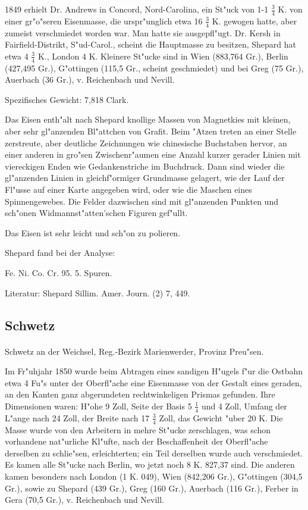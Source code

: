 \documentclass[a4paper, 11pt, oneside]{article}
\begin{document}
1849 erhielt Dr. Andrews in Concord, Nord-Carolina, ein St"uck von 1-1 $\frac{3}{4}$ K. von einer gr"o"seren Eisenmasse, die urspr"unglich etwa 16 $\frac{3}{4}$ K. gewogen hatte, aber zumeist verschmiedet worden war. Man hatte sie ausgepfl"ugt. Dr. Kersh in Fairfield-Distrikt, S"ud-Carol., scheint die Hauptmasse zu besitzen, Shepard hat etwa 4 $\frac{3}{4}$ K., London 4 K. Kleinere St"ucke sind in Wien (883,764 Gr.), Berlin (427,495 Gr.), G"ottingen (115,5 Gr., scheint geschmiedet) und bei Greg (75 Gr.), Auerbach (36 Gr.), v. Reichenbach und Nevill.

Spezifisches Gewicht: 7,818 Clark.

Das Eisen enth"alt nach Shepard knollige Massen von Magnetkies mit kleinen, aber sehr gl"anzenden Bl"attchen von Grafit. Beim "Atzen treten an einer Stelle zerstreute, aber deutliche Zeichnungen wie chinesische Buchstaben hervor, an einer anderen in gro"sen Zwischenr"aumen eine Anzahl kurzer gerader Linien mit viereckigen Enden wie Gedankenstriche im Buchdruck. Dann sind wieder die gl"anzenden Linien in gleichf"ormiger Grundmasse gelagert, wie der Lauf der Fl"usse auf einer Karte angegeben wird, oder wie die Maschen eines Spinnengewebes. Die Felder dazwischen sind mit gl"anzenden Punkten und sch"onen Widmannst"atten'schen Figuren gef"ullt.

Das Eisen ist sehr leicht und sch"on zu polieren.

Shepard fand bei der Analyse:

Fe. Ni. Co. Cr.  
95. 5. Spuren.

Literatur: Shepard Sillim. Amer. Journ. (2) 7, 449.

\subsection{Schwetz}
\normalsize
\paragraph{}
Schwetz an der Weichsel, Reg.-Bezirk Marienwerder, Provinz Preu"sen.

Im Fr"uhjahr 1850 wurde beim Abtragen eines sandigen H"ugels f"ur die Ostbahn etwa 4 Fu"s unter der Oberfl"ache eine Eisenmasse von der Gestalt eines geraden, an den Kanten ganz abgerundeten rechtwinkeligen Prismas gefunden. Ihre Dimensionen waren: H"ohe 9 Zoll, Seite der Basis 5 $\frac{1}{4}$ und 4 Zoll, Umfang der L"ange nach 24 Zoll, der Breite nach 17 $\frac{3}{4}$ Zoll, das Gewicht "uber 20 K. Die Masse wurde von den Arbeitern in mehre St"ucke zerschlagen, was schon vorhandene nat"urliche Kl"ufte, nach der Beschaffenheit der Oberfl"ache derselben zu schlie"sen, erleichterten; ein Teil derselben wurde auch verschmiedet. Es kamen alle St"ucke nach Berlin, wo jetzt noch 8 K. 827,37 sind. Die anderen kamen besonders nach London (1 K. 049), Wien (842,206 Gr.), G"ottingen (304,5 Gr.), sowie zu Shepard (439 Gr.), Greg (160 Gr.), Auerbach (116 Gr.), Ferber in Gera (70,5 Gr.), v. Reichenbach und Nevill.
\end{document}

